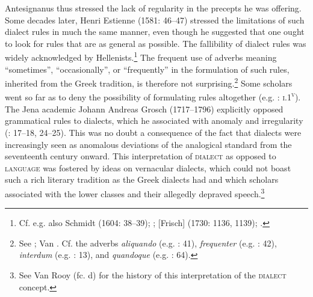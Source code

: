 \documentclass[output=paper]{langsci/langscibook}
\begin{document}
Antesignanus thus stressed the lack of regularity in the precepts he was offering. Some decades later, Henri Estienne (1581: 46–47) stressed the limitations of such dialect rules in much the same manner, even though he suggested that one ought to look for rules that are as general as possible. The fallibility of dialect rules was widely acknowledged by Hellenists.\footnote{ \textrm{Cf. e.g. also Schmidt (1604: 38–39); \citet[2]{Heupel1712}; [Frisch] (1730: 1136, 1139); \citet[299]{Jehne1782}.}} The frequent use of adverbs meaning “sometimes”, “occasionally”, or “frequently” in the formulation of such rules, inherited from the Greek tradition, is therefore not surprising.\footnote{ \textrm{See \citet[53]{Förstel1999}; Van \citet[516]{Rooy2014}. Cf. the adverbs} \textrm{\textit{aliquando}} \textrm{(e.g. \citealt{Walper1589}: 41),} \textrm{\textit{frequenter}} \textrm{(e.g. \citealt{Walper1589}: 42),} \textrm{\textit{interdum}} \textrm{(e.g. \citealt{Antesignanus1554}: 13),}\textrm{ }\textrm{and} \textrm{\textit{quandoque}} \textrm{(e.g. \citealt{Walper1589}: 64).}} Some scholars went so far as to deny the possibility of formulating rules altogether (e.g. \citealt{Camden1595}: \textsc{i}.1\textsc{\textsuperscript{v}}). The Jena academic Johann Andreas Grosch (1717–1796) explicitly opposed grammatical rules to dialects, which he associated with anomaly and irregularity (\citealt{Grosch1753}: 17–18, 24–25). This was no doubt a consequence of the fact that dialects were increasingly seen as anomalous deviations of the analogical standard from the seventeenth century onward. This interpretation of \textsc{dialect} as opposed to \textsc{language} was fostered by ideas on vernacular dialects, which could not boast such a rich literary tradition as the Greek dialects had and which scholars associated with the lower classes and their allegedly depraved speech.\footnote{ \textrm{See Van Rooy (fc. d) for the history of this interpretation of the} \textrm{\textsc{dialect}} \textrm{concept.}}
\end{document}

